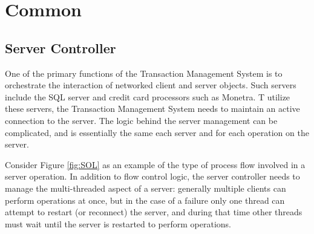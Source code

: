 \documentclass[a4paper,oneside,10pt]{report}
\begin{document}
\section{Common}
\subsection{Server Controller}
One of the primary functions of the Transaction Management System is to orchestrate the interaction of networked client and server objects. Such servers include the SQL server and credit card processors such as Monetra. T utilize these servers, the Transaction Management System needs to maintain an active connection to the server. The logic behind the server management can be complicated, and is essentially the same each server and for each operation on the server. 

Consider Figure \ref{fig:SOL} as an example of the type of process flow involved in a server operation. In addition to flow control logic, the server controller needs to manage the multi-threaded aspect of a server: generally multiple clients can perform operations at once, but in the case of a failure only one thread can attempt to restart (or reconnect) the server, and during that time other threads must wait until the server is restarted to perform operations. 
\end{document}
